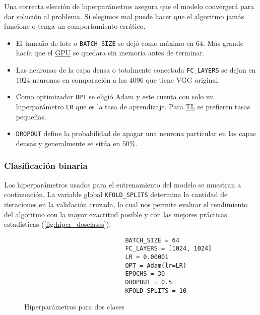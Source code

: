 Una correcta elección de hiperparámetros asegura que el modelo convergerá para
dar solución al problema. Si elegimos mal puede hacer que el algoritmo jamás
funcione o tenga un comportamiento errático. 

\begin{itemize}
    \item El tamaño de lote o \texttt{BATCH_SIZE} se dejó como máximo
    en $64$. Más grande hacía que el \hyperlink{abbr}{GPU} se quedara sin memoria antes de terminar.
    \item Las neuronas de la capa densa o totalmente conectada
    \texttt{FC_LAYERS} se dejan en $1024$ neuronas en comparación a
    las $4096$ que tiene VGG original.
    \item Como optimizador \texttt{OPT} se eligió Adam y este cuenta
    con solo un hiperparámetro \texttt{LR} que es la tasa de
    aprendizaje. Para \hyperlink{abbr}{TL} se prefieren tasas pequeñas.
    \item \texttt{DROPOUT} define la probabilidad de apagar una
    neurona particular en las capas densas y generalmente se sitúa en $50\%$.
\end{itemize}

\subsubsection{Clasificación binaria}

Los hiperparámetros usados para el entrenamiento del modelo se muestran a
continuación. La variable global \texttt{KFOLD_SPLITS} determina la
cantidad de iteraciones en la validación cruzada, lo cual nos permite evaluar el
rendimiento del algoritmo con la mayor exactitud posible y con las mejores
prácticas estadísticas (\autoref{fig:hiper_dosclases}).

\begin{figure}[H]
    \centering
    \begin{verbatim}
                            BATCH_SIZE = 64
                            FC_LAYERS = [1024, 1024]
                            LR = 0.00001
                            OPT = Adam(lr=LR)
                            EPOCHS = 30
                            DROPOUT = 0.5
                            KFOLD_SPLITS = 10
    \end{verbatim}
     \caption{Hiperparámetros para dos clases}
     \label{fig:hiper_dosclases}
\end{figure}

